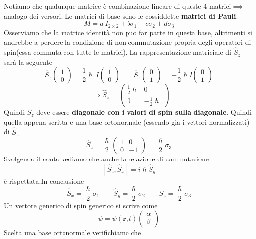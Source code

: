 Notiamo che qualunque matrice è combinazione lineare di queste 4
matrici\(\implies\) analogo dei versori.
Le matrici di base sono le
cossiddette \textbf{matrici di Pauli}. \[
	M = a \ I_{2 \times 2} + b \sigma_{1} + c \sigma_{2} + d \sigma_{3}
\] Osserviamo che la matrice identità non puo far parte in questa base,
altrimenti si andrebbe a perdere la condizione di non commutazione
propria degli operatori di spin(essa commuta con tutte le matrici).
La
rappresentazione matriciale di \(\hat{S}_{z}\) sarà la seguente \[
	\hat{S}_{z} \begin{pmatrix}
		1 \\
		0
	\end{pmatrix} =
	\frac{1}{2} \hslash \ I
	\begin{pmatrix}
		1 \\
		0
	\end{pmatrix}
	\qquad
	\hat{S}_{z} \begin{pmatrix}
		0 \\
		1
	\end{pmatrix}
	= - \frac{1}{2} \hslash I \begin{pmatrix}
		0 \\
		1
	\end{pmatrix}
\] \[
	\implies
	\hat{S}_{z} =
	\begin{pmatrix}
		\frac{1}{2} \hslash & 0                     \\
		0                   & - \frac{1}{2} \hslash
	\end{pmatrix}
\] Quindi \(\hat{S}_{z}\) deve essere \textbf{diagonale con i valori di
	spin sulla diagonale}.
Quindi quella appena scritta e una base
ortonormale (essendo gia i vettori normalizzati) di \(\hat{S}_{z}\)
\[
	\hat{S}_{z} = \frac{\hslash}{2}
	\begin{pmatrix}
		1 & 0  \\
		0 & -1
	\end{pmatrix} = \frac{\hslash}{2} \sigma_{3}
\] Svolgendo il conto vediamo che anche la relazione di commutazione
\[
	[ \hat{S}_{z}, \hat{S}_{x}] = i \hslash \hat{S}_{y}
\]
è rispettata.In conclusione
\[
	\hat{S}_{x} = \frac{\hslash}{2} \sigma_{1} \qquad
	\hat{S}_{y} =  \frac{\hslash}{2} \sigma_{2} \qquad
	\hat{S}_{z} = \frac{\hslash}{2} \sigma_{3}
\] Un vettore generico di spin generico si scrive come
\[
	\psi = \psi (\bm{r},t)
	\begin{pmatrix}
		\alpha \\
		\beta
	\end{pmatrix}
\]
Scelta una base ortonormale verifichiamo che
